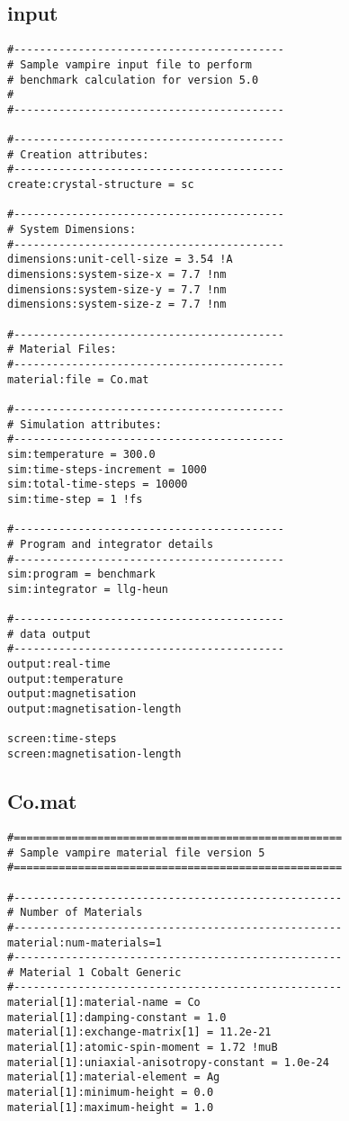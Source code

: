 \subsection*{input}
{\footnotesize
\begin{verbatim}
#------------------------------------------
# Sample vampire input file to perform
# benchmark calculation for version 5.0
#
#------------------------------------------

#------------------------------------------
# Creation attributes:
#------------------------------------------
create:crystal-structure = sc

#------------------------------------------
# System Dimensions:
#------------------------------------------
dimensions:unit-cell-size = 3.54 !A
dimensions:system-size-x = 7.7 !nm
dimensions:system-size-y = 7.7 !nm
dimensions:system-size-z = 7.7 !nm

#------------------------------------------
# Material Files:
#------------------------------------------
material:file = Co.mat

#------------------------------------------
# Simulation attributes:
#------------------------------------------
sim:temperature = 300.0
sim:time-steps-increment = 1000
sim:total-time-steps = 10000
sim:time-step = 1 !fs

#------------------------------------------
# Program and integrator details
#------------------------------------------
sim:program = benchmark
sim:integrator = llg-heun

#------------------------------------------
# data output
#------------------------------------------
output:real-time
output:temperature
output:magnetisation
output:magnetisation-length

screen:time-steps
screen:magnetisation-length
\end{verbatim}
}
\subsection*{Co.mat}
{\footnotesize
\begin{verbatim}
#===================================================
# Sample vampire material file version 5
#===================================================

#---------------------------------------------------
# Number of Materials
#---------------------------------------------------
material:num-materials=1
#---------------------------------------------------
# Material 1 Cobalt Generic
#---------------------------------------------------
material[1]:material-name = Co
material[1]:damping-constant = 1.0
material[1]:exchange-matrix[1] = 11.2e-21
material[1]:atomic-spin-moment = 1.72 !muB
material[1]:uniaxial-anisotropy-constant = 1.0e-24
material[1]:material-element = Ag
material[1]:minimum-height = 0.0
material[1]:maximum-height = 1.0
\end{verbatim}
}


